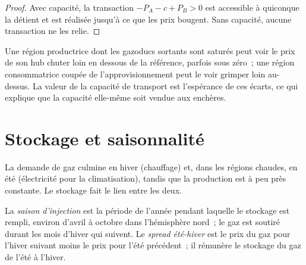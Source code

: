 \begin{proof}
Avec capacité, la transaction $-P_A - c + P_B > 0$ est accessible à quiconque la détient et
est réalisée jusqu'à ce que les prix bougent. Sans capacité, aucune transaction ne les relie.
\end{proof}

Une région productrice dont les gazoducs sortants sont saturés peut voir le prix de son hub chuter
loin en dessous de la référence, parfois sous zéro~; une région consommatrice coupée de
l'approvisionnement peut le voir grimper loin au-dessus. La valeur de la capacité de transport est
l'espérance de ces écarts, ce qui explique que la capacité elle-même soit vendue aux enchères.

\section{Stockage et saisonnalité}

La demande de gaz culmine en hiver (chauffage) et, dans les régions chaudes, en été (électricité
pour la climatisation), tandis que la production est à peu près constante. Le stockage fait le lien entre les deux.

\begin{definition}\label{def:m3:natural-gas-and-lng:season}
La \emph{saison d'injection} est la période de l'année pendant laquelle
le stockage est rempli, environ d'avril à octobre dans l'hémisphère nord~; le gaz est
soutiré durant les mois d'hiver qui suivent. Le \emph{spread été-hiver}
est le prix du gaz pour l'hiver suivant moins
le prix pour l'été précédent~; il rémunère le stockage du gaz de l'été à l'hiver.
\end{definition}

